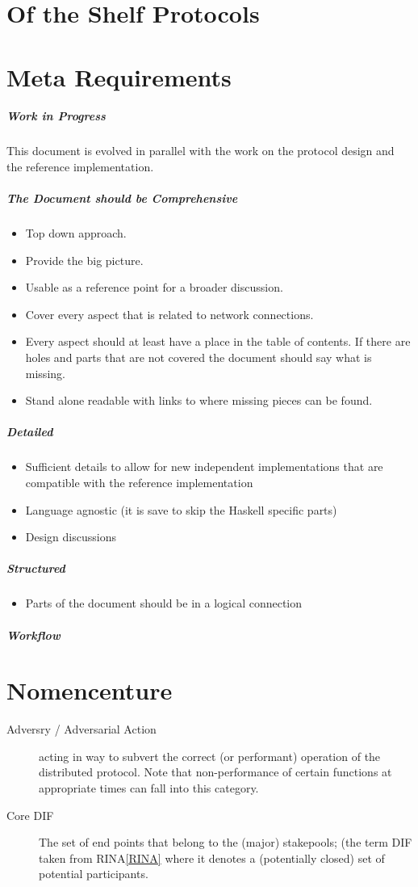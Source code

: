\documentclass{report}
\theoremstyle{definition}{
  \newtheorem{lemma}{Lemma}[section] %
  \newtheorem{definition}[lemma]{Definition}
}
\theoremstyle{theorem}{
  \newtheorem{invariant}[lemma]{Invariant}
  \newtheorem{proofobligation}[lemma]{Proof Obligation}
}
\numberwithin{equation}{lemma}
\begin{document}
\section{Of the Shelf Protocols}
\section{Meta Requirements}
\subparagraph{Work in Progress}
This document is evolved in parallel with the work on the protocol design and
the reference implementation.

\subparagraph{The Document should be Comprehensive}
\begin{itemize}
\item Top down approach.
\item Provide the big picture.
\item Usable as a reference point for a broader discussion.
\item Cover every aspect that is related to network connections.
\item Every aspect should at least have a place in the table of contents.
  If there are holes and parts that are not covered the document should say what is missing.
\item Stand alone readable with links to where missing pieces can be found.
\end{itemize}

\subparagraph{Detailed}
\begin{itemize}
\item Sufficient details to allow for new independent implementations that are compatible with
the reference implementation
\item Language agnostic (it is save to skip the Haskell specific parts)
\item Design discussions
\end{itemize}
\subparagraph{Structured}
\begin{itemize}
\item Parts of the document should be in a logical connection
\end{itemize}
\subparagraph{Workflow}




\appendix
\section{Nomencenture}
\begin{description}
\item[Adversry / Adversarial Action] acting in way to subvert the
  correct (or performant) operation of the distributed protocol. Note
  that non-performance of certain functions at appropriate times can
  fall into this category.
\item[Core DIF] The set of end points that belong to the (major)
  stakepools; (the term DIF taken from RINA\ref{RINA} where it denotes
  a (potentially closed) set of potential participants.
  

\end{description}
\end{document}
